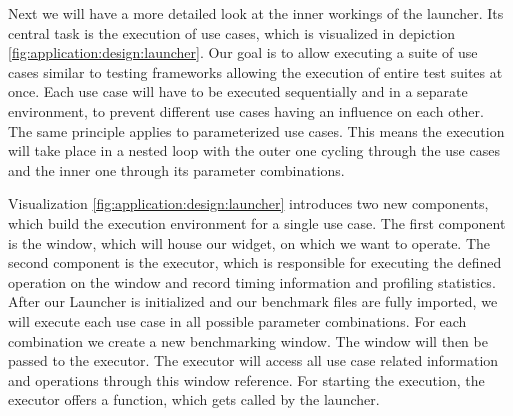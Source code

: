 Next we will have a more detailed look at the inner workings of the launcher.
Its central task is the execution of use cases, which is visualized in depiction
\ref{fig:application:design:launcher}. Our goal is to allow executing a suite of
use cases similar to testing frameworks allowing the execution of entire test
suites at once. Each use case will have to be executed sequentially and in a
separate environment, to prevent different use cases having an influence on each
other.  The same principle applies to parameterized use cases. This means the
execution will take place in a nested loop with the outer one cycling through
the use cases and the inner one through its parameter combinations.

Visualization \ref{fig:application:design:launcher} introduces two new
components, which build the execution environment for a single use case. The
first component is the window, which will house our widget, on which we want to
operate. The second component is the executor, which is responsible for
executing the defined operation on the window and record timing information and
profiling statistics. After our Launcher is initialized and our benchmark files
are fully imported, we will execute each use case in all possible parameter
combinations. For each combination we create a new benchmarking window. The
window will then be passed to the executor. The executor will access all use
case related information and operations through this window reference. For
starting the execution, the executor offers a 
function, which gets called by the launcher.

